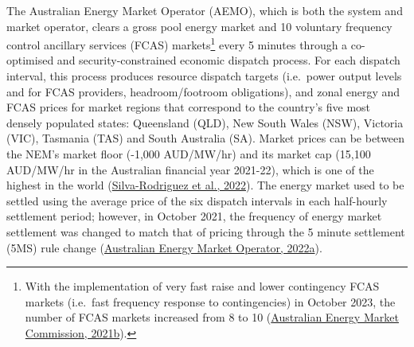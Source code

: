 \documentclass[12pt,a4paper,]{report}
\begin{document}
The Australian Energy Market Operator (AEMO), which is both the system
and market operator, clears a gross pool energy market and 10 voluntary
frequency control ancillary services (FCAS) markets\footnote{With the
  implementation of very fast raise and lower contingency FCAS markets
  (i.e.~fast frequency response to contingencies) in October 2023, the
  number of FCAS markets increased from 8 to 10
  (\protect\hyperlink{ref-australianenergymarketcommissionFastFrequencyResponse2021}{Australian
  Energy Market Commission, 2021b}).} every 5 minutes through a
co-optimised and security-constrained economic dispatch process. For
each dispatch interval, this process produces resource dispatch targets
(i.e.~power output levels and for FCAS providers, headroom/footroom
obligations), and zonal energy and FCAS prices for market regions that
correspond to the country's five most densely populated states:
Queensland (QLD), New South Wales (NSW), Victoria (VIC), Tasmania (TAS)
and South Australia (SA). Market prices can be between the NEM's market
floor (-1,000 AUD/MW/hr) and its market cap (15,100 AUD/MW/hr in the
Australian financial year 2021-22), which is one of the highest in the
world
(\protect\hyperlink{ref-silva-rodriguezShortTermWholesale2022}{Silva-Rodriguez
et al., 2022}). The energy market used to be settled using the average
price of the six dispatch intervals in each half-hourly settlement
period; however, in October 2021, the frequency of energy market
settlement was changed to match that of pricing through the 5 minute
settlement (5MS) rule change
(\protect\hyperlink{ref-australianenergymarketoperator5MSCommencement2022}{Australian
Energy Market Operator, 2022a}).
\end{document}
